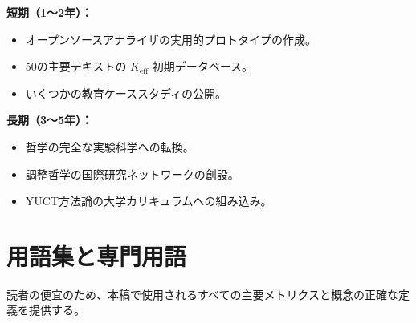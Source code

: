 \documentclass[11pt,a4paper]{article}
\begin{document}
	\textbf{短期（1～2年）：}
	\begin{itemize}
		\item オープンソースアナライザの実用的プロトタイプの作成。
		\item 50の主要テキストの \(K_{\mathrm{eff}}\) 初期データベース。
		\item いくつかの教育ケーススタディの公開。
	\end{itemize}
	
	\textbf{長期（3～5年）：}
	\begin{itemize}
		\item 哲学の完全な実験科学への転換。
		\item 調整哲学の国際研究ネットワークの創設。
		\item YUCT方法論の大学カリキュラムへの組み込み。
	\end{itemize}
	
	\section{用語集と専門用語}
	\label{sec:glossary}
	
	読者の便宜のため、本稿で使用されるすべての主要メトリクスと概念の正確な定義を提供する。
	
\end{document}
